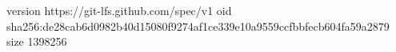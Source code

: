 version https://git-lfs.github.com/spec/v1
oid sha256:de28cab6d0982b40d15080f9274af1ce339e10a9559ccfbbfecb604fa59a2879
size 1398256
